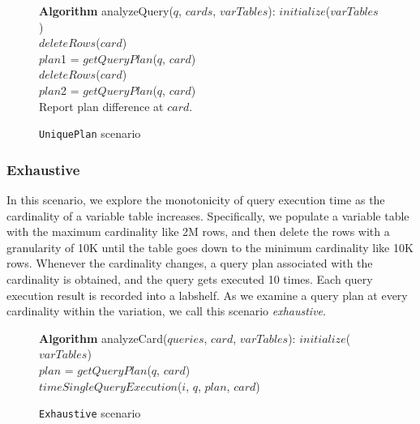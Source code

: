 \documentclass[conference]{IEEEtran}
\begin{document}
\begin{figure}[t]
\begin{center}
\begin{algorithmic}
{\bf Algorithm} analyzeQuery($q$, $cards$, $varTables$): 
\STATE $initialize$($varTables$) \\
   \STATE $deleteRows$($card$) \\
\ENDFOR
\STATE $plan$1 = $getQueryPlan$($q$, $card$) \\ 
   \STATE $deleteRows$($card$) \\
\ENDFOR
\STATE $plan$2 = $getQueryPlan$($q$, $card$) \\ 
	\STATE Report plan difference at $card$. \\
\ENDIF
\end{algorithmic}
\caption{ {\tt UniquePlan} scenario\label{alg:uniquplan}}
\end{center}
\end{figure}

\subsubsection{Exhaustive}
In this scenario, we explore the monotonicity of query execution time 
as the cardinality of a variable table increases. 
Specifically, we populate a variable table with the maximum cardinality like 2M rows, 
and then delete the rows with a granularity of 10K until the table goes down to 
the minimum cardinality like 10K rows. Whenever the cardinality changes, 
a query plan associated with the cardinality is obtained, and the query gets executed 10 times. 
Each query execution result is recorded into a labshelf. 
As we examine a query plan at every cardinality within the variation, 
we call this scenario {\em exhaustive}. 

\begin{figure}[t]
\begin{center}
\begin{algorithmic}
{\bf Algorithm} analyzeCard($queries$, $card$, $varTables$): 
\STATE $initialize$($varTables$) \\
   \STATE $plan$ = $getQueryPlan$($q$, $card$) \\ 
         \STATE $timeSingleQueryExecution$($i$, $q$,  $plan$, $card$) \\
   \ENDFOR
\ENDFOR
\end{algorithmic}
\caption{ {\tt Exhaustive} scenario\label{alg:exhaustive}}
\end{center}
\end{figure}
\end{document}
